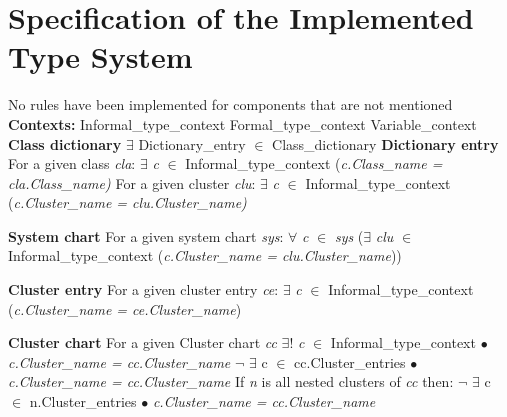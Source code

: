 \chapter{Specification of the Implemented Type System}
\label{appendix-type-system}
No rules have been implemented for components that are not mentioned\newline\newline
\footnotesize \textbf{Contexts:}\newline
\indent Informal\_type\_context\newline
\indent Formal\_type\_context\newline
\indent Variable\_context\newline
\textbf{Class dictionary}\newline
\indent $\exists$ Dictionary\_entry $\in$ Class\_dictionary\newline
\indent\textbf{Dictionary entry}\newline
\indent\indent For a given class \textit{cla}:\newline
\indent\indent\indent $\exists$ \textit{c} $\in$ Informal\_type\_context (\textit{c.Class\_name = cla.Class\_name)}\newline
\indent\indent For a given cluster \textit{clu}:\newline
\indent\indent\indent $\exists$ \textit{c} $\in$ Informal\_type\_context (\textit{c.Cluster\_name = clu.Cluster\_name)}

\noindent\textbf{System chart}\newline
\indent For a given system chart \textit{sys}:\newline
\indent\indent$\forall$ \textit{c} $\in$ \textit{sys} ($\exists$ \textit{clu} $\in$ Informal\_type\_context (\textit{c.Cluster\_name = clu.Cluster\_name}))

\noindent\textbf{Cluster entry} \newline
\indent For a given cluster entry \textit{ce}:\newline
\indent\indent$\exists$ \textit{c} $\in$ Informal\_type\_context (\textit{c.Cluster\_name = ce.Cluster\_name})

\noindent\textbf{Cluster chart} \newline
\indent For a given Cluster chart \textit{cc}\newline
\indent\indent $\exists !$  \textit{c} $\in$ Informal\_type\_context $\bullet$ \textit{c.Cluster\_name = cc.Cluster\_name}\newline
\indent\indent $\neg$ $\exists$ c $\in$ cc.Cluster\_entries $\bullet$ \textit{c.Cluster\_name = cc.Cluster\_name}\newline
\indent If \textit{n} is all nested clusters of \textit{cc} then:\newline
\indent\indent $\neg$ $\exists$ c $\in$ n.Cluster\_entries $\bullet$ \textit{c.Cluster\_name = cc.Cluster\_name}

